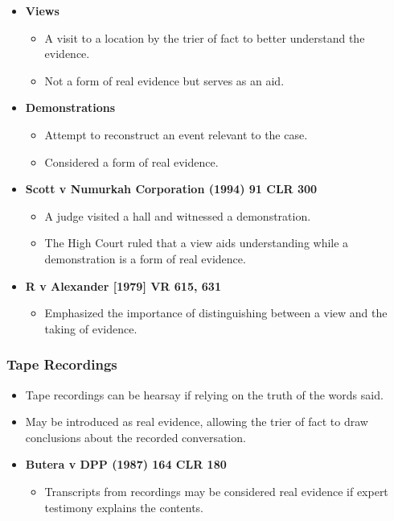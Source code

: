 \begin{itemize}
\tightlist
\item
  \textbf{Views}

  \begin{itemize}
  \tightlist
  \item
    A visit to a location by the trier of fact to better understand the
    evidence.
  \item
    Not a form of real evidence but serves as an aid.
  \end{itemize}
\item
  \textbf{Demonstrations}

  \begin{itemize}
  \tightlist
  \item
    Attempt to reconstruct an event relevant to the case.
  \item
    Considered a form of real evidence.
  \end{itemize}
\item
  \textbf{Scott v Numurkah Corporation (1994) 91 CLR 300}

  \begin{itemize}
  \tightlist
  \item
    A judge visited a hall and witnessed a demonstration.
  \item
    The High Court ruled that a view aids understanding while a
    demonstration is a form of real evidence.
  \end{itemize}
\item
  \textbf{R v Alexander {[}1979{]} VR 615, 631}

  \begin{itemize}
  \tightlist
  \item
    Emphasized the importance of distinguishing between a view and the
    taking of evidence.
  \end{itemize}
\end{itemize}

\subsubsection{Tape Recordings}\label{tape-recordings}

\begin{itemize}
\tightlist
\item
  Tape recordings can be hearsay if relying on the truth of the words
  said.
\item
  May be introduced as real evidence, allowing the trier of fact to draw
  conclusions about the recorded conversation.
\item
  \textbf{Butera v DPP (1987) 164 CLR 180}

  \begin{itemize}
  \tightlist
  \item
    Transcripts from recordings may be considered real evidence if
    expert testimony explains the contents.
  \end{itemize}
\end{itemize}

